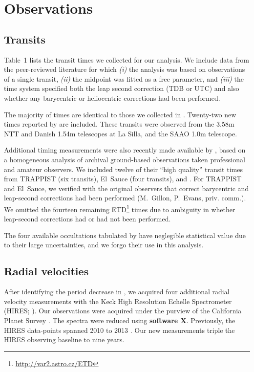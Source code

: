 \documentclass[12pt,twocolumn,tighten]{aastex62}
\begin{document}
\section{Observations}
\label{sec:observations}

\subsection{Transits}

Table~1 lists the transit times we collected for our analysis.  We
include data from the peer-reviewed literature for which {\it (i)} the
analysis was based on observations of a single transit, {\it (ii)} the
midpoint was fitted as a free parameter, and {\it (iii)} the time
system specified both the leap second correction (TDB or UTC) and also
whether any barycentric or heliocentric corrections had been
performed.

The majority of times are identical to those we collected in
.  Twenty-two new times reported by
\citet{southworth_transit_2019} are included.  These transits were
observed from the 3.58m NTT and Danish 1.54m telescopes at La Silla,
and the SAAO 1.0m telescope.

Additional timing measurements were also recently made available by
\citet{baluev_2019}, based on a homogeneous analysis of archival
ground-based observations taken professional and amateur observers.
We included twelve of their ``high quality'' transit times from
TRAPPIST (six transits), El~Sauce (four transits), and
\citet{petrucci_no_2013}.  For TRAPPIST and El~Sauce, we verified with
the original observers that correct barycentric and leap-second
corrections had been performed (M.~Gillon, P.~Evans, priv{.} comm{.}).
We omitted the fourteen remaining \citeauthor{baluev_2019}
ETD\footnote{\url{http://var2.astro.cz/ETD}} times due to ambiguity in
whether leap-second corrections had or had not been performed.

The four available occultations tabulated by
 have neglegible statistical value due
to their large uncertainties, and we forgo their use in this analysis.

\subsection{Radial velocities}

After identifying the period decrease in
, we acquired four additional radial
velocity measurements with the Keck High Resolution Echelle
Spectrometer (HIRES; \citealt{vogt_hires_1994}).  Our observations
were acquired under the purview of the California Planet Survey
\citep{howard_cps_2010}.  The spectra were reduced using {\bf software
X}.  Previously, the HIRES data-points spanned 2010 to 2013
\citep{knutson_friends_2014}.  Our new measurements triple the HIRES
observing baseline to nine years.
\end{document}
